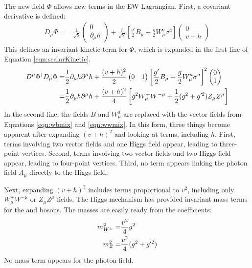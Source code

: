 The new field $\Phi$ allows new terms in the EW Lagrangian.
First, a covariant derivative is defined:
\begin{equation}\begin{split}
        D_\mu\Phi=&\frac{1}{\sqrt{2}}\begin{pmatrix}0\\\partial_\mu h\end{pmatrix}+\frac{i}{\sqrt{2}}\left[\frac{g'}{2}B_\mu+\frac{g}{2}W_\mu^a\sigma^a\right] \begin{pmatrix}0\\v+h\end{pmatrix}
\end{split}\end{equation}
This defines an invariant kinetic term for $\Phi$, which is expanded in the first line of Equation \ref{eqn:scalarKinetic}.
\begin{equation}\begin{split}\label{eqn:scalarKinetic}
    D^\mu\Phi^\dagger D_\mu\Phi =& \frac{1}{2}\partial_\mu h\partial^\mu h+\frac{(v+h)^2}{2}\begin{pmatrix}0&1\end{pmatrix}\left[\frac{g'}{2}B_\mu+\frac{g}{2}W_\mu^a\sigma^a\right]^2\begin{pmatrix}0\\1\end{pmatrix} \\
    =& \frac{1}{2}\partial_\mu h\partial^\mu h+\frac{(v+h)^2}{4}\left[g^2W^+_\mu W^{-\mu}+\frac{1}{2}(g^2+g'^2)Z_\mu Z^\mu\right] \\
\end{split}\end{equation}
In the second line, the fields $B$ and $W_\mu^a$ are replaced with the vector fields from Equations \ref{eqn:wbmix} and \ref{eqn:wwmix}.
In this form, three things become apparent after expanding $(v+h)^2$ and looking at terms, including $h$.
First, terms involving two vector fields and one Higgs field appear, leading to three-point vertices.
Second, terms involving two vector fields and two Higgs field appear, leading to four-point vertices.
Third, no term appears linking the photon field $A_\mu$ directly to the Higgs field.

Next, expanding $(v+h)^2$ includes terms proportional to $v^2$, including only $W^+_\mu W^{-\mu}$ or $Z_\mu Z^\mu$ fields.
The Higgs mechanism has provided invariant mass terms for the \Z and \W bosons.
The masses are easily ready from the coefficients:
\begin{equation}\begin{split}
m_{W^\pm}^2=&\frac{v^2}{4}g^2 \\
m_{Z}^2=&\frac{v^2}{4}(g^2+g'^2) \\
\end{split}\end{equation}
No mass term appears for the photon field.

